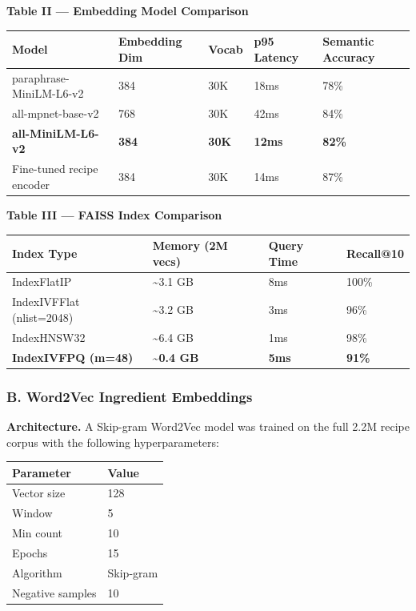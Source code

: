 \documentclass[
  10pt,
]{article}
\begin{document}
\textbf{Table II --- Embedding Model Comparison}

\begin{longtable}[]{@{}lllll@{}}
\toprule\noalign{}
Model & Embedding Dim & Vocab & p95 Latency & Semantic Accuracy \\
\midrule\noalign{}
\endhead
\bottomrule\noalign{}
\endlastfoot
paraphrase-MiniLM-L6-v2 & 384 & 30K & 18ms & 78\% \\
all-mpnet-base-v2 & 768 & 30K & 42ms & 84\% \\
\textbf{all-MiniLM-L6-v2} & \textbf{384} & \textbf{30K} & \textbf{12ms}
& \textbf{82\%} \\
Fine-tuned recipe encoder & 384 & 30K & 14ms & 87\% \\
\end{longtable}

\textbf{Table III --- FAISS Index Comparison}

\begin{longtable}[]{@{}llll@{}}
\toprule\noalign{}
Index Type & Memory (2M vecs) & Query Time & Recall@10 \\
\midrule\noalign{}
\endhead
\bottomrule\noalign{}
\endlastfoot
IndexFlatIP & \textasciitilde3.1 GB & 8ms & 100\% \\
IndexIVFFlat (nlist=2048) & \textasciitilde3.2 GB & 3ms & 96\% \\
IndexHNSW32 & \textasciitilde6.4 GB & 1ms & 98\% \\
\textbf{IndexIVFPQ (m=48)} & \textbf{\textasciitilde0.4 GB} &
\textbf{5ms} & \textbf{91\%} \\
\end{longtable}

\subsubsection{B. Word2Vec Ingredient
Embeddings}\label{b.-word2vec-ingredient-embeddings}

\textbf{Architecture.} A Skip-gram Word2Vec model was trained on the
full 2.2M recipe corpus with the following hyperparameters:

\begin{longtable}[]{@{}ll@{}}
\toprule\noalign{}
Parameter & Value \\
\midrule\noalign{}
\endhead
\bottomrule\noalign{}
\endlastfoot
Vector size & 128 \\
Window & 5 \\
Min count & 10 \\
Epochs & 15 \\
Algorithm & Skip-gram \\
Negative samples & 10 \\
\end{longtable}
\end{document}
